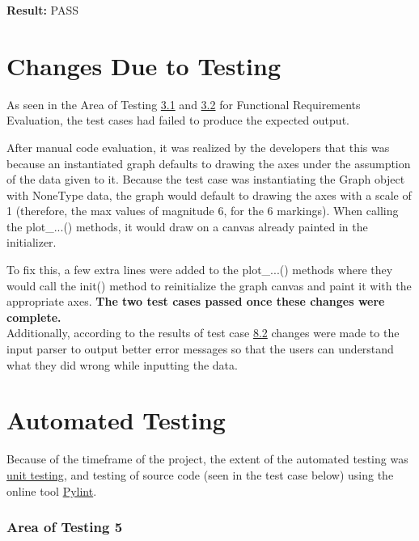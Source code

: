 \documentclass[12pt, titlepage]{article}
\begin{document}
\begin{enumerate}
			\textbf{Result:} PASS

		\end{enumerate}	



\section{Changes Due to Testing}

As seen in the Area of Testing \hyperref[sec:3.1]{3.1} and \hyperref[sec:3.2]{3.2} for Functional Requirements Evaluation, the test cases had failed to produce the expected output. 

After manual code evaluation, it was realized by the developers that this was because an instantiated graph defaults to drawing the axes under the assumption of the data given to it. Because the test case was instantiating the Graph object with NoneType data, the graph would default to drawing the axes with a scale of 1 (therefore, the max values of magnitude 6, for the 6 markings). When calling the plot\_...() methods, it would draw on a canvas already painted in the initializer. 

To fix this, a few extra lines were added to the plot\_...() methods where they would call the init() method to reinitialize the graph canvas and paint it with the appropriate axes. 
\textbf{The two test cases passed once these changes were complete.}  \\

Additionally, according to the results of test case \hyperref[sec:8.2]{8.2} changes were made to the input parser to output better error messages so that the users can understand what they did wrong while inputting the data.
\section{Automated Testing}
Because of the timeframe of the project, the extent of the automated testing was \hyperref[sec:unittest]{unit testing}, and testing of source code (seen in the test case below) using the online tool \href{https://www.pylint.org}{Pylint}.



\subsubsection{Area of Testing 5}		
\end{document}
